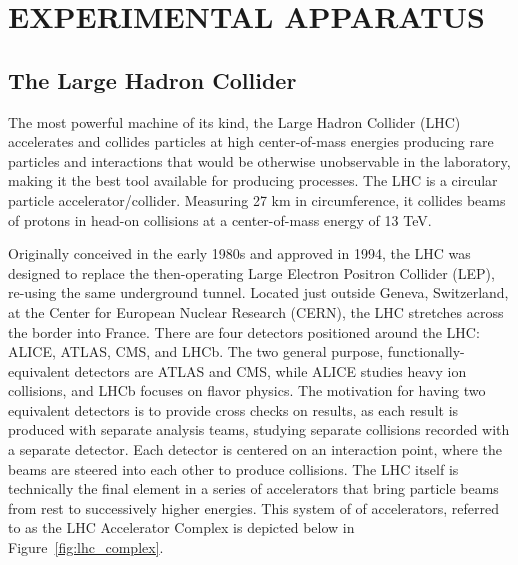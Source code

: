 %
%

\chapter{EXPERIMENTAL APPARATUS}
\label{chap:detector}

\section{The Large Hadron Collider}
\label{sec:lhc}
The most powerful machine of its kind, the Large Hadron
Collider (LHC) accelerates and collides particles
at high center-of-mass energies producing rare
particles and interactions that would be otherwise unobservable
in the laboratory, making it the best tool available for producing \tth
processes. The LHC is a circular particle accelerator/collider. Measuring 27 km
in circumference, it collides beams of protons in head-on collisions       
at a center-of-mass energy of 13 TeV.

Originally conceived in the early 1980s and approved in 1994, the LHC was designed to replace the then-operating
Large Electron Positron Collider (LEP), re-using the same underground tunnel. Located just outside Geneva, Switzerland, at the Center for European Nuclear Research (CERN),
the LHC stretches across the border into France. There are four detectors positioned around the LHC: ALICE, ATLAS, CMS, and LHCb. The two general purpose,
functionally-equivalent detectors are ATLAS and CMS, while ALICE studies heavy ion collisions, and LHCb focuses on flavor physics. 
The motivation for having two equivalent detectors is to provide cross checks on results, as each result is produced with separate analysis teams, studying separate collisions
recorded with a separate detector. Each detector is centered on an interaction point, where the beams are steered into each other to produce collisions. 
The LHC itself is technically the final element in a series of accelerators
that bring particle beams from rest to successively higher energies. This system of
of accelerators, referred to as the LHC Accelerator Complex is depicted below in
Figure~\ref{fig:lhc_complex}.

